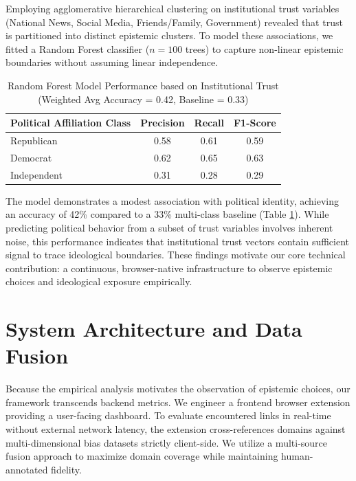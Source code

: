 \documentclass[10pt, conference, compsoc]{IEEEtran}
\begin{document}
Employing agglomerative hierarchical clustering on institutional trust variables (National News, Social Media, Friends/Family, Government) revealed that trust is partitioned into distinct epistemic clusters. To model these associations, we fitted a Random Forest classifier ($n=100$ trees) to capture non-linear epistemic boundaries without assuming linear independence.

\begin{table}[htbp]
\caption{Random Forest Model Performance based on Institutional Trust (Weighted Avg Accuracy = 0.42, Baseline = 0.33)}
\begin{center}
\begin{tabular}{lccc}
\toprule
\textbf{Political Affiliation Class} & \textbf{Precision} & \textbf{Recall} & \textbf{F1-Score} \\
\midrule
Republican & 0.58 & 0.61 & 0.59 \\
Democrat & 0.62 & 0.65 & 0.63 \\
Independent & 0.31 & 0.28 & 0.29 \\
\bottomrule
\end{tabular}
\label{tab:rf_performance}
\end{center}
\end{table}

The model demonstrates a modest association with political identity, achieving an accuracy of 42\% compared to a 33\% multi-class baseline (Table \ref{tab:rf_performance}). While predicting political behavior from a subset of trust variables involves inherent noise, this performance indicates that institutional trust vectors contain sufficient signal to trace ideological boundaries. These findings motivate our core technical contribution: a continuous, browser-native infrastructure to observe epistemic choices and ideological exposure empirically.


\section{System Architecture and Data Fusion}
Because the empirical analysis motivates the observation of epistemic choices, our framework transcends backend metrics. We engineer a frontend browser extension providing a user-facing dashboard. To evaluate encountered links in real-time without external network latency, the extension cross-references domains against multi-dimensional bias datasets strictly client-side. We utilize a multi-source fusion approach to maximize domain coverage while maintaining human-annotated fidelity.
\end{document}
